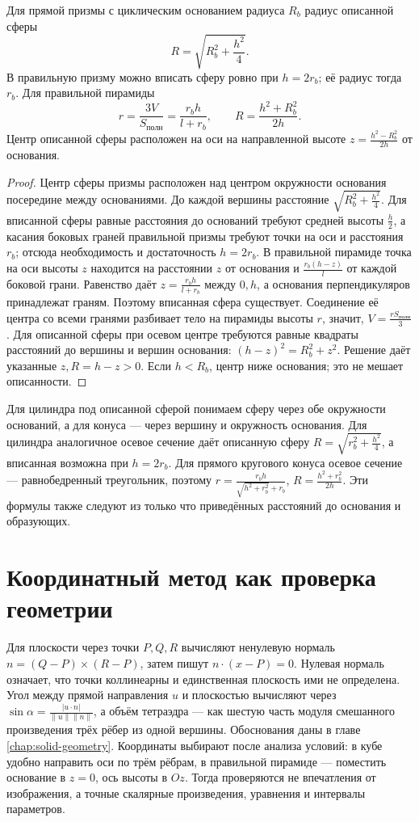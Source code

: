 \begin{theorem}\label{thm:exam-solid-spheres}
Для прямой призмы с циклическим основанием радиуса \(R_b\) радиус описанной сферы
\[
R=\sqrt{R_b^2+\frac{h^2}{4}}.
\]
В правильную призму можно вписать сферу ровно при \(h=2r_b\); её радиус тогда \(r_b\). Для правильной пирамиды
\[
r=\frac{3V}{S_{\mathrm{полн}}}=\frac{r_bh}{l+r_b},\qquad
R=\frac{h^2+R_b^2}{2h}.
\]
Центр описанной сферы расположен на оси на направленной высоте \(z=\frac{h^2-R_b^2}{2h}\) от основания.
\end{theorem}
\begin{proof}Центр сферы призмы расположен над центром окружности основания посередине между основаниями. До каждой вершины расстояние \(\sqrt{R_b^2+\frac{h^2}{4}}\). Для вписанной сферы равные расстояния до оснований требуют средней высоты \(\frac{h}{2}\), а касания боковых граней правильной призмы требуют точки на оси и расстояния \(r_b\); отсюда необходимость и достаточность \(h=2r_b\).
В правильной пирамиде точка на оси высоты \(z\) находится на расстоянии \(z\) от основания и \(\frac{r_b(h-z)}{l}\) от каждой боковой грани. Равенство даёт \(z=\frac{r_bh}{l+r_b}\) между \(0,h\), а основания перпендикуляров принадлежат граням. Поэтому вписанная сфера существует. Соединение её центра со всеми гранями разбивает тело на пирамиды высоты \(r\), значит, \(V=\frac{rS_{\mathrm{полн}}}{3}\).
Для описанной сферы при осевом центре требуются равные квадраты расстояний до вершины и вершин основания: \((h-z)^2=R_b^2+z^2\). Решение даёт указанные \(z,R=h-z>0\). Если \(h<R_b\), центр ниже основания; это не мешает описанности.\end{proof}
Для цилиндра под описанной сферой понимаем сферу через обе окружности оснований, а для конуса — через вершину и окружность основания. Для цилиндра аналогичное осевое сечение даёт описанную сферу \(R=\sqrt{r_b^2+\frac{h^2}{4}}\), а вписанная возможна при \(h=2r_b\). Для прямого кругового конуса осевое сечение — равнобедренный треугольник, поэтому \(r=\frac{r_bh}{\sqrt{h^2+r_b^2}+r_b}\), \(R=\frac{h^2+r_b^2}{2h}\). Эти формулы также следуют из только что приведённых расстояний до основания и образующих.

\section{Координатный метод как проверка геометрии}
Для плоскости через точки \(P,Q,R\) вычисляют ненулевую нормаль \(n=(Q-P)\times(R-P)\), затем пишут \(n\cdot(x-P)=0\). Нулевая нормаль означает, что точки коллинеарны и единственная плоскость ими не определена. Угол между прямой направления \(u\) и плоскостью вычисляют через \(\sin\alpha=\frac{|u\cdot n|}{\|u\|\|n\|}\), а объём тетраэдра — как шестую часть модуля смешанного произведения трёх рёбер из одной вершины. Обоснования даны в главе \ref{chap:solid-geometry}.
Координаты выбирают после анализа условий: в кубе удобно направить оси по трём рёбрам, в правильной пирамиде — поместить основание в \(z=0\), ось высоты в \(Oz\). Тогда проверяются не впечатления от изображения, а точные скалярные произведения, уравнения и интервалы параметров.

